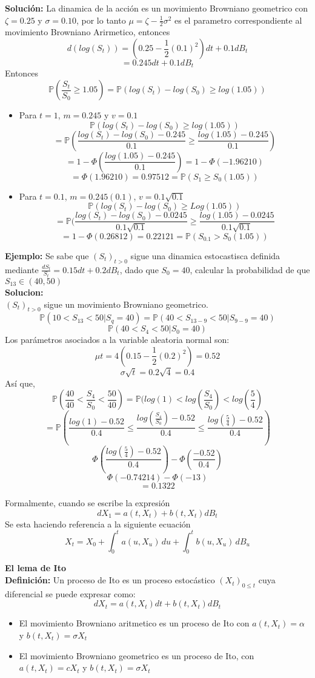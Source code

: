 \documentclass[12pts]{extarticle}
\begin{document}
\textbf{Solución:}
La dinamica de la acción es un movimiento Browniano geometrico con $\zeta=0.25$ y $\sigma=0.10$, por lo tanto $\mu=\zeta-\frac{1}{2}\sigma^2$ es el parametro correspondiente al movimiento Browniano Arirmetico, entonces $$d(log(S_t))=(0.25-\frac{1}{2}(0.1)^2)dt+0.1dB_t$$ $$=0.245dt+0.1dB_t$$
Entonces $$\mathbb{P}(\frac{S_t}{S_0}\geq 1.05)=\mathbb{P}(log(S_t)-log(S_0)\geq log(1.05))$$
\begin{itemize}
\item Para $t=1$, $m=0.245$ y $v=0.1$
$$\mathbb{P}(log(S_t)-log(S_0)\geq log(1.05))$$
$$=\mathbb{P}(\frac{log(S_t)-log(S_0)-0.245}{0.1}\geq \frac{log(1.05)-0.245}{0.1})$$
$$=1-\Phi(\frac{log(1.05)-0.245}{0.1})=1-\Phi(-1.96210)$$
$$=\Phi(1.96210)=0.97512=\mathbb{P}(S_1\geq S_0(1.05))$$ 
\item Para $t=0.1$, $m=0.245(0.1)$, $v=0.1\sqrt{0.1}$ 
$$\mathbb{P}(log(S_t)-log(S_0)\geq Log(1.05))$$
$$=\mathbb{P}(\frac{log(S_t)-log(S_0)-0.0245}{0.1\sqrt{0.1}} \geq \frac{log(1.05)-0.0245}{0.1\sqrt{0.1}}$$
$$=1-\Phi(0.26812)=0.22121=\mathbb{P}(S_{0.1} > S_0 (1.05))$$
\end{itemize} 
\textbf{Ejemplo:} Se sabe que $(S_t)_{t>0}$ sigue una dinamica estocastisca definida mediante $\frac{dS_t}{S_t}=0.15dt+0.2dB_t$, dado que $S_0=40$, calcular la probabilidad de que $S_{13} \in (40,50)$
\\ 
\textbf{Solucion:}   \\
$(S_t)_{t>0}$ sigue un movimiento Browniano geometrico. $$ \mathbb{P}(10<S_13 <50 | S_q =40)=\mathbb{P}(40<S_{13-9}<50 | S_{9-9}=40)$$  $$\mathbb{P}(40<S_4 <50 | S_0=40)$$
Los parámetros asociados a la variable aleatoria normal son: $$\mu t = 4(0.15-\frac{1}{2}(0.2)^2)=0.52$$  $$\sigma \sqrt{t} =0.2 \sqrt{4} =0.4$$
Así que, $$\mathbb{P}(\frac{40}{40} < \frac{S_4}{S_0} <\frac{50}{40}) = \mathbb{P}(log(1)<log(\frac{S_4}{S_0}) < log(\frac{5}{4}) $$ $$=\mathbb{P}(\frac{log(1)-0.52}{0.4} \leq \frac{log(\frac{S_4}{S_0})-0.52}{0.4} \leq \frac{log(\frac{5}{4})-0.52}{0.4})$$
$$ \Phi (\frac{log(\frac{5}{4})-0.52}{0.4})-\Phi(\frac{-0.52}{0.4})$$ $$\Phi(-0.74214)-\Phi(-13)$$ $$=0.1322$$ 

Formalmente, cuando se escribe la expresión $$dX_1 =a(t, X_t)+b(t, X_t)dB_t$$ Se esta haciendo referencia a la siguiente ecuación $$X_t = X_0 + \int_{0}^{t} a(u,X_u) \,du + \int_{0}^{t} b(u,X_u) \,dB_u$$

\textbf{El lema de Ito} \\
 
\textbf{Definición:} Un proceso de Ito es un proceso estocástico $(X_t)_{0 \leq t}$ cuya diferencial se puede expresar como: $$ dX_t = a(t,X_t)dt +b(t,X_t)dB_t  $$
\begin{itemize}
\item El movimiento Browniano aritmetico es un proceso de Ito con $a(t,X_t)=\alpha$ y $b(t,X_t)=\sigma X_t$ 
\item El movimiento Browniano geometrico es un proceso de Ito, con $a(t, X_t)=cX_t$ y $ b(t, X_t)=\sigma X_t$ 
\end{itemize}
 
\end{document}
